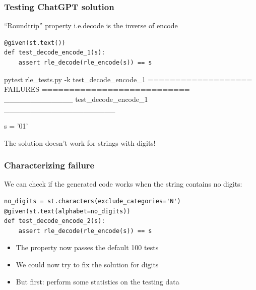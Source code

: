 \documentclass{beamer}
\begin{document}
\begin{frame}[fragile]
  \frametitle{Testing ChatGPT solution}

  \begin{block}{``Roundtrip'' property i.e.\@ decode is the inverse of encode}
\begin{verbatim}
@given(st.text())
def test_decode_encode_1(s):
    assert rle_decode(rle_encode(s)) == s
\end{verbatim}
    \end{block}\pause


\begin{semiverbatim}
pytest rle_tests.py -k test_decode_encode_1
=================== FAILURES ===========================
\alert{_____________ test_decode_encode_1 _____________________}

s = '01'
\end{semiverbatim}

The solution doesn't work for strings with digits!
  
\end{frame}

\begin{frame}[fragile]
  \frametitle{Characterizing failure}

  We can check if the generated code
  works when the string contains no digits:
\begin{verbatim}
no_digits = st.characters(exclude_categories='N')
@given(st.text(alphabet=no_digits))
def test_decode_encode_2(s):
    assert rle_decode(rle_encode(s)) == s
\end{verbatim}

  \begin{itemize}
  \item The property now passes the default 100 tests
  \item We could now try to fix the solution for digits
  \item But first: perform some statistics on the testing data
  \end{itemize}
\end{frame}
\end{document}
